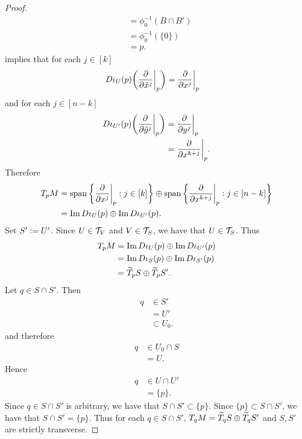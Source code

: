 \documentclass{book}
\begin{document}
\begin{proof}
\begin{align*}
			& = \phi_0^{-1}(B \cap B') \\
			& = \phi_0^{-1}(\{0\}) \\
			& = p.
		\end{align*}
		 implies that for each $j \in [k]$
		\begin{align*}
			D\iota_U(p) \bigg( \frac{\partial}{\partial \tilde{x}^j} \bigg|_p \bigg) 
			& = \frac{\partial}{\partial x^j} \bigg|_p 
		\end{align*}
		and for each $j \in [n-k]$
		\begin{align*}
			D\iota_{U'}(p) \bigg( \frac{\partial}{\partial \tilde{y}^j} \bigg|_p \bigg) 
			& = \frac{\partial}{\partial y^j} \bigg|_p \\
			& = \frac{\partial}{\partial x^{k+j}} \bigg|_p.
		\end{align*}
		Therefore 
		\begin{align*}
			T_pM
			& = \operatorname{span} \bigg \{  \frac{\partial}{\partial x^j} \bigg|_p  : j \in [k] \bigg \} \oplus \operatorname{span} \bigg \{  \frac{\partial}{\partial x^{k+j}} \bigg|_p  : j \in [n-k] \bigg \} \\
			& = \text{Im} \, D \iota_U(p) \oplus \text{Im} \, D \iota_{U'}(p).
		\end{align*}
		Set $S' \vcentcolon= U'$. Since $U \in \mathcal{T}_V$ and $V \in \mathcal{T}_S$, we have that $U \in \mathcal{T}_S$. Thus
		\begin{align*}
			T_pM
			& = \text{Im} \, D \iota_U(p) \oplus \text{Im} \, D \iota_{U'}(p) \\
			& = \text{Im} \, D \iota_S(p) \oplus \text{Im} \, D \iota_{S'}(p) \\
			& = \widetilde{T}_p S \oplus \widetilde{T}_p S'.
		\end{align*}
		Let $q \in S \cap S'$. Then 
		\begin{align*}
			q 
			& \in S' \\
			& = U' \\
			& \subset U_0.
		\end{align*}
		and therefore
		\begin{align*}
			q 
			& \in U_0 \cap S \\
			& = U.
		\end{align*}
		Hence 
		\begin{align*}
			q 
			& \in U \cap U' \\
			& = \{p\}.
		\end{align*}
		Since $q \in S \cap S'$ is arbitrary, we have that $S \cap S' \subset \{p\}$. Since $\{p\} \subset S \cap S'$, we have that $S \cap S' = \{p\}$.
		Thus for each $q \in S \cap S'$, $T_qM = \widetilde{T}_q S \oplus \widetilde{T}_q S'$ and $S, S'$ are strictly transverse. 
	\end{proof}
\end{document}
